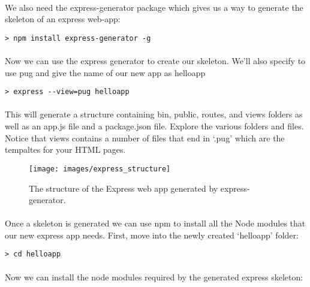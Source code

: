 \documentclass[10pt, a4paper, twosize]{article}
\begin{document}
\paragraph{} We also need the express-generator package which gives us a way to generate the skeleton of an express web-app:

\begin{lstlisting}[style=DOS]
    > npm install express-generator -g
\end{lstlisting}

\paragraph{} Now we can use the express generator to create our skeleton. We'll also specify to use pug and give the name of our new app as helloapp

\begin{lstlisting}[style=DOS]
    > express --view=pug helloapp
\end{lstlisting}

\paragraph{} This will generate a structure containing bin, public, routes, and views folders as well as an app.js file and a package.json file. Explore the various folders and files. Notice that views contains a number of files that end in `.pug' which are the tempaltes for your HTML pages. 

\begin{figure}[H]
\texttt{[image: images/express\_structure]}
\caption{The structure of the Express web app generated by express-generator.}
\label{fig:express_structure}
\end{figure}


\paragraph{} Once a skeleton is generated we can use npm to install all the Node modules that our new express app needs. First, move into the newly created `helloapp' folder:

\begin{lstlisting}[style=DOS]
    > cd helloapp
\end{lstlisting}

\paragraph{} Now we can install the node modules required by the generated express skeleton:
\end{document}
